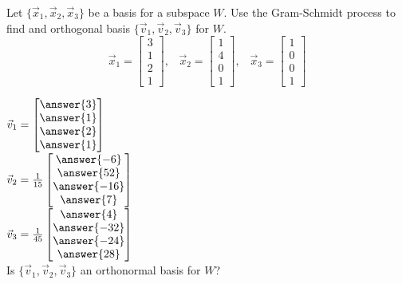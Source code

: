 \documentclass{ximera}
\begin{document}
  	  		    	 \begin{question} 
  	  		    	 	Let $\{\vec{x}_1, \vec{x}_2,\vec{x}_3\}$ be a basis for a subspace $W$. Use the Gram-Schmidt process to find and orthogonal basis $\{\vec{v}_1,\vec{v}_2,\vec{v}_3\}$ for $W$.
  	  		    	 	$$\vec{x}_1 = \begin{bmatrix} 3\\1\\2\\1\end{bmatrix}, \hspace{10pt} \vec{x}_2 = \begin{bmatrix} 1\\4\\0\\1\end{bmatrix},\hspace{10pt} \vec{x}_3 = \begin{bmatrix} 1\\0\\0\\1\end{bmatrix}$$
  	  		    	 	
  	  		    	 	$\vec{v}_1 = \begin{bmatrix} \answer{3}\\\answer{1}\\\answer{2}\\\answer{1}\end{bmatrix}$\vspace{10pt}\\
  	  		    	 	$\vec{v}_2 = \frac{1}{15}\begin{bmatrix} \answer{-6}\\\answer{52}\\\answer{-16}\\\answer{7}\end{bmatrix}$\vspace{10pt}\\
  	  		    	 		$\vec{v}_3 = \frac{1}{45}\begin{bmatrix} \answer{4}\\\answer{-32}\\\answer{-24}\\\answer{28}\end{bmatrix}$\vspace{10pt}\\
  	  		    	 	Is $\{\vec{v}_1,\vec{v}_2,\vec{v}_3\}$ an orthonormal basis for $W$?
  	  		    	 	\begin{multipleChoice}
  	  		    	 		\end{multipleChoice}
  	  		    	 \end{question}
\end{document}
